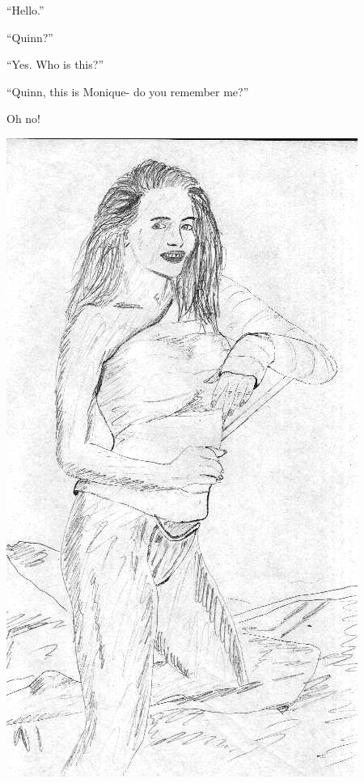 ``Hello.''

``Quinn?''

``Yes. Who is this?''

``Quinn, this is Monique- do you remember me?''

Oh no!

\newpage
\begin{center}
\includegraphics{images/kicks09.jpg}
\end{center}
